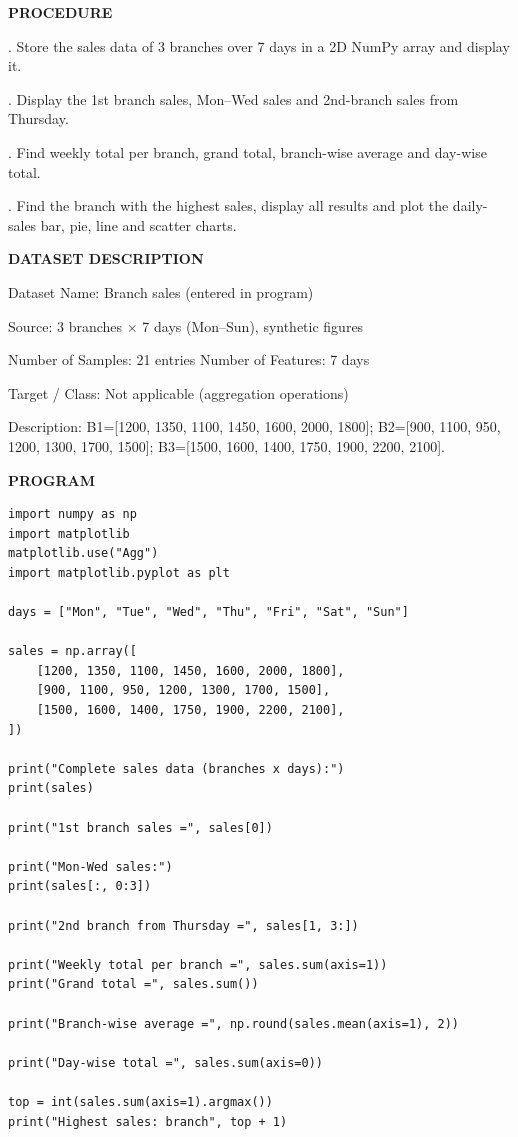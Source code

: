 \documentclass[11pt,twoside]{article}
\newcommand{\expheading}[1]{{\fontsize{14}{17}\selectfont\textbf{#1}\par}}
\newcommand{\toevenpage}{\clearpage\ifodd\value{page}\null\thispagestyle{empty}\newpage\fi}
\begin{document}
{\expheading{PROCEDURE}
\vspace{4pt}
. Store the sales data of 3 branches over 7 days in a 2D NumPy array and display it.\par
{}. Display the 1st branch sales, Mon--Wed sales and 2nd-branch sales from Thursday.\par
{}. Find weekly total per branch, grand total, branch-wise average and day-wise total.\par
{}. Find the branch with the highest sales, display all results and plot the daily-sales bar, pie, line and scatter charts. \par
\vspace{4pt}

\expheading{DATASET DESCRIPTION}
\vspace{4pt}
\noindent Dataset Name: Branch sales (entered in program)\par
\noindent Source: 3 branches $\times$ 7 days (Mon--Sun), synthetic figures\par
\noindent Number of Samples: 21 entries \hspace{0.3cm} Number of Features: 7 days\par
\noindent Target / Class: Not applicable (aggregation operations)\par
\noindent Description: B1=[1200, 1350, 1100, 1450, 1600, 2000, 1800]; B2=[900, 1100, 950, 1200, 1300, 1700, 1500]; B3=[1500, 1600, 1400, 1750, 1900, 2200, 2100]. \par
\vspace{4pt}
} %

\toevenpage
\expheading{PROGRAM}
\vspace{6pt}

\begin{lstlisting}
import numpy as np
import matplotlib
matplotlib.use("Agg")
import matplotlib.pyplot as plt

days = ["Mon", "Tue", "Wed", "Thu", "Fri", "Sat", "Sun"]

sales = np.array([
    [1200, 1350, 1100, 1450, 1600, 2000, 1800],
    [900, 1100, 950, 1200, 1300, 1700, 1500],
    [1500, 1600, 1400, 1750, 1900, 2200, 2100],
])

print("Complete sales data (branches x days):")
print(sales)

print("1st branch sales =", sales[0])

print("Mon-Wed sales:")
print(sales[:, 0:3])

print("2nd branch from Thursday =", sales[1, 3:])

print("Weekly total per branch =", sales.sum(axis=1))
print("Grand total =", sales.sum())

print("Branch-wise average =", np.round(sales.mean(axis=1), 2))

print("Day-wise total =", sales.sum(axis=0))

top = int(sales.sum(axis=1).argmax())
print("Highest sales: branch", top + 1)
\end{lstlisting}
\end{document}
